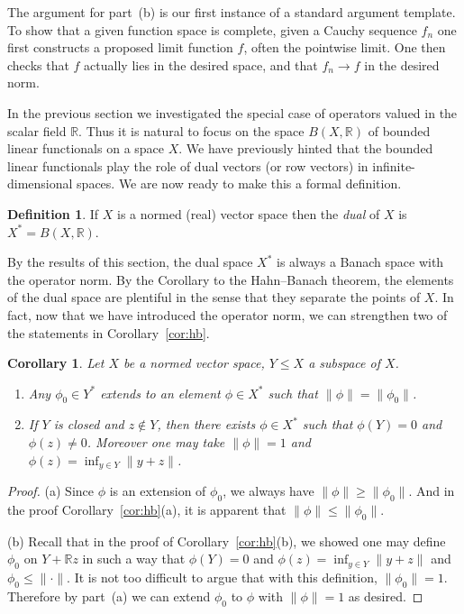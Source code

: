 \documentclass[11pt,oneside]{amsbook}
\newcommand{\RR}{{\mathbb R}}
\theoremstyle{definition}
\theoremstyle{plain}
\newtheorem{cor}[thm]{Corollary}
\theoremstyle{definition}
\newtheorem{defn}[thm]{Definition}
\theoremstyle{remark}
\numberwithin{equation}{section}
\numberwithin{figure}{section}
\begin{document}
The argument for part~(b) is our first instance of a standard argument template. To show that a given function space is complete, given a Cauchy sequence $f_n$ one first constructs a proposed limit function $f$, often the pointwise limit. One then checks that $f$ actually lies in the desired space, and that $f_n\to f$ in the desired norm.

In the previous section we investigated the special case of operators valued in the scalar field $\RR$. Thus it is natural to focus on the space $B(X,\RR)$ of bounded linear functionals on a space $X$. We have previously hinted that the bounded linear functionals play the role of dual vectors (or row vectors) in infinite-dimensional spaces. We are now ready to make this a formal definition.

\begin{defn}
  If $X$ is a normed (real) vector space then the \emph{dual} of $X$ is $X^*=B(X,\RR)$.
\end{defn}

By the results of this section, the dual space $X^*$ is always a Banach space with the operator norm. By the Corollary to the Hahn--Banach theorem, the elements of the dual space are plentiful in the sense that they separate the points of $X$. In fact, now that we have introduced the operator norm, we can strengthen two of the statements in Corollary~\ref{cor:hb}.

\begin{cor}
  \label{cor:hb2}
  Let $X$ be a normed vector space, $Y\leq X$ a subspace of $X$.
  \begin{enumerate}
  \item Any $\phi_0\in Y^*$ extends to an element $\phi\in X^*$ such that $\|\phi\|=\|\phi_0\|$.
  \item If $Y$ is closed and $z\notin Y$, then there exists $\phi\in X^*$ such that $\phi(Y)=0$ and $\phi(z)\neq0$. Moreover one may take $\|\phi\|=1$ and $\phi(z)=\inf_{y\in Y}\|y+z\|$.
  \end{enumerate}
\end{cor}

\begin{proof}
  (a) Since $\phi$ is an extension of $\phi_0$, we always have $\|\phi\|\geq\|\phi_0\|$. And in the proof Corollary~\ref{cor:hb}(a), it is apparent that $\|\phi\|\leq\|\phi_0\|$.

  (b) Recall that in the proof of Corollary~\ref{cor:hb}(b), we showed one may define $\phi_0$ on $Y+\RR z$ in such a way that $\phi(Y)=0$ and $\phi(z)=\inf_{y\in Y}\|y+z\|$ and $\phi_0\leq\|\cdot\|$. It is not too difficult to argue that with this definition, $\|\phi_0\|=1$. Therefore by part~(a) we can extend $\phi_0$ to $\phi$ with $\|\phi\|=1$ as desired.
\end{proof}
\end{document}
